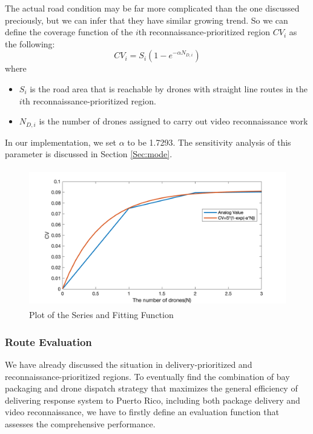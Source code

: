 \documentclass{mcmthesis}
\begin{document}
The actual road condition may be far more complicated than the one discussed preciously, but we can infer that they have similar growing trend. So we can define the coverage function of the $i$th reconnaissance-prioritized region $CV_i$ as the following:
\begin{equation}\label{Equ:cs}
    CV_i = S_i(1 - e^{-\alpha N_{D,i}})
\end{equation}
where 
\begin{itemize}
    \item $S_i$ is the road area that is reachable by drones with straight line routes in the $i$th reconnaissance-prioritized region. 
    \item $N_{D,i}$ is the number of drones assigned to carry out video reconnaissance work 
\end{itemize}
In our implementation, we set $\alpha$ to be 1.7293. The sensitivity analysis of this parameter is discussed in Section \ref{Sec:mode}.

\begin{figure}[htbp]
    \centering
    \includegraphics[width=12cm,height=6cm]{figures/alpha7.png}
    \caption{Plot of the Series and Fitting Function}
    \label{Fig:cvft}
\end{figure}

\subsubsection{Route Evaluation}
We have already discussed the situation in delivery-prioritized and reconnaissance-prioritized regions. To eventually find the combination of bay packaging and drone dispatch strategy that maximizes the general efficiency of delivering response system to Puerto Rico, including both package delivery and video reconnaissance, we have to firstly define an evaluation function that assesses the comprehensive performance. 
\end{document}
